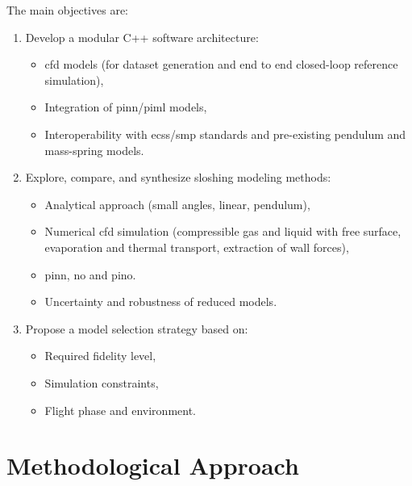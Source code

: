 \documentclass[12pt]{article}
\begin{document}
	The main objectives are:
	\begin{enumerate}
		\item Develop a modular C++ software architecture:
		\begin{itemize}
			\item \acrshort{cfd} models (for dataset generation and end to end closed-loop reference simulation),
			\item Integration of \gls{pinn}/\acrshort{piml} models,
			\item Interoperability with \acrshort{ecss}/\acrshort{smp} standards and pre-existing pendulum and mass-spring models.
		\end{itemize}
		\item Explore, compare, and synthesize sloshing modeling methods:
		\begin{itemize}
			\item Analytical approach (small angles, linear, pendulum),
			\item Numerical \acrshort{cfd} simulation (compressible gas and liquid with free surface, evaporation and thermal transport, extraction of wall forces),
			\item \acrfull{pinn}, \acrfull{no} and \acrfull{pino}.
			
			\item Uncertainty and robustness of reduced models.
		\end{itemize}
		\item Propose a model selection strategy based on:
		\begin{itemize}
			\item Required fidelity level,
			\item Simulation constraints,
			\item Flight phase and environment.
		\end{itemize}
	\end{enumerate}
	
	\section*{Methodological Approach}
	
\end{document}

